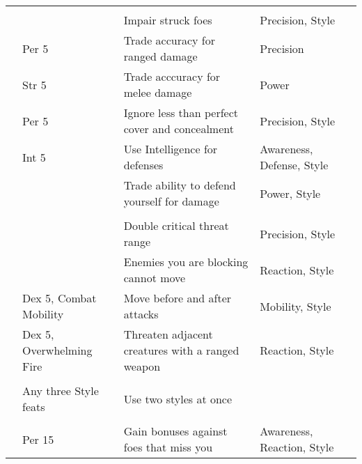 \begin{longtabuwrapper}
\begin{longtabu}{>{\lcol}p{10em} >{\lcol}p{15em} >{\lcol}X >{\lcol}p{6em} >{\lcol}p{3em}}
        \midrule
         &  &  &  &  \\
         & \x & Impair struck foes & Precision, Style &  \\
         & Per 5 & Trade accuracy for ranged damage & Precision &  \\
         & Str 5 & Trade acccuracy for melee damage & Power &  \\
         & Per 5 & Ignore less than perfect cover and concealment & Precision, Style &  \\
         & Int 5 & Use Intelligence for defenses & Awareness, Defense, Style &  \\
         & \x & Trade ability to defend yourself for damage & Power, Style &  \\

        \midrule
         &  &  &  &  \\
         & \x & Double critical threat range & Precision, Style &  \\
         & \x & Enemies you are blocking cannot move & Reaction, Style &  \\
         & Dex 5, Combat Mobility & Move before and after attacks & Mobility, Style &  \\
         & Dex 5, Overwhelming Fire & Threaten adjacent creatures with a ranged weapon & Reaction, Style &  \\

        \midrule
         &  &  &  &  \\
         & Any three Style feats & Use two styles at once & \x &  \\

        \midrule
         &  &  &  &  \\
         & Per 15 & Gain bonuses against foes that miss you & Awareness, Reaction, Style &  \\
    \end{longtabu}
\end{longtabuwrapper}

